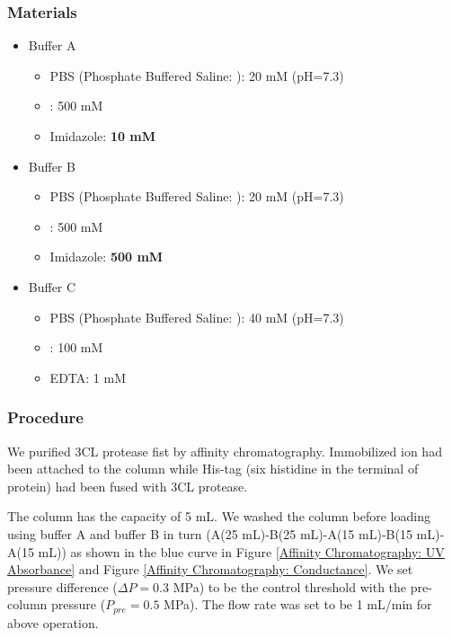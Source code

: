 \documentclass{report}
\begin{document}
\subsubsection{Materials}
\begin{itemize}
    \item Buffer A
    \begin{itemize}
        \item PBS (Phosphate Buffered Saline: ): 20 mM (pH=7.3)
        \item {}: 500 mM
        \item Imidazole: \textbf{10 mM}
    \end{itemize}
    \item Buffer B
    \begin{itemize}
        \item PBS (Phosphate Buffered Saline: ): 20 mM (pH=7.3)
        \item {}: 500 mM
        \item Imidazole: \textbf{500 mM}
    \end{itemize}
    \item Buffer C
    \begin{itemize}
        \item PBS (Phosphate Buffered Saline: ): 40 mM (pH=7.3)
        \item {}: 100 mM
        \item EDTA: 1 mM
    \end{itemize}
\end{itemize}
\subsubsection{Procedure}
We purified 3CL protease fist by affinity chromatography.
Immobilized  ion had been attached to the column while His-tag (six histidine in the terminal of protein) had been fused with 3CL protease.

The  column has the capacity of 5 mL.
We washed the column before loading using buffer A and buffer B in turn (A(25 mL)-B(25 mL)-A(15 mL)-B(15 mL)-A(15 mL)) as shown in the blue curve in Figure \ref{Affinity Chromatography: UV Absorbance} and Figure \ref{Affinity Chromatography: Conductance}.
We set pressure difference ($\Delta P=0.3$ MPa) to be the control threshold with the pre-column pressure ($P_{pre}=0.5$ MPa).
The flow rate was set to be 1 mL/min for above operation.
\end{document}
